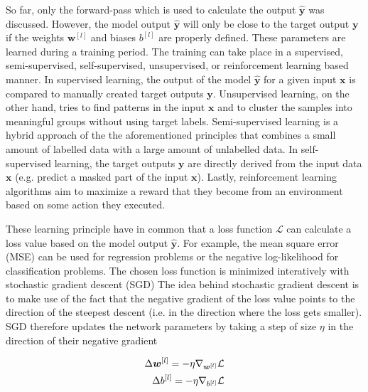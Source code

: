 So far, only the forward-pass which is used to calculate the output \(\boldsymbol{\hat{y}}\) was discussed.
However, the model output \(\boldsymbol{\hat{y}}\) will only be close to the target output \(\boldsymbol{y}\) if the weights \(\boldsymbol{w}^{[l]}\) and biases \(b^{[l]}\) are properly defined.
These parameters are learned during a training period.
The training can take place in a supervised, semi-supervised, self-supervised, unsupervised, or reinforcement learning based manner.
In supervised learning, the output of the model \(\boldsymbol{\hat{y}}\) for a given input \(\boldsymbol{x}\) is compared to manually created target outputs \(\boldsymbol{y}\).
Unsupervised learning, on the other hand, tries to find patterns in the input \(\boldsymbol{x}\) and to cluster the samples into meaningful groups without using target labels.
Semi-supervised learning is a hybrid approach of the the aforementioned principles that combines a small amount of labelled data with a large amount of unlabelled data.
In self-supervised learning, the target outputs \(\boldsymbol{y}\) are directly derived from the input data \(\boldsymbol{x}\) (e.g. predict a masked part of the input \(\boldsymbol{x}\)).
Lastly, reinforcement learning algorithms aim to maximize a reward that they become from an environment based on some action they executed.

These learning principle have in common that a loss function \(\mathcal{L}\) can calculate a loss value based on the model output \(\boldsymbol{\hat{y}}\). 
For example, the mean square error (MSE) can be used for regression problems or the negative log-likelihood for classification problems.
The chosen loss function is minimized interatively with stochastic gradient descent (SGD)%
The idea behind stochastic gradient descent is to make use of the fact that the negative gradient of the loss value points to the direction of the steepest descent (i.e. in the direction where the loss gets smaller).
SGD therefore updates the network parameters by taking a step of size \(\eta\) in the direction of their negative gradient

\begin{equation}\eqlbl{sgd}
	\begin{aligned}
		\Delta \boldsymbol{w}^{[l]} = -\eta \nabla_{\boldsymbol{w}^{[l]}} \mathcal{L}\\
		\Delta b^{[l]} = -\eta \nabla_{b^{[l]}} \mathcal{L}
	\end{aligned}
\end{equation}


